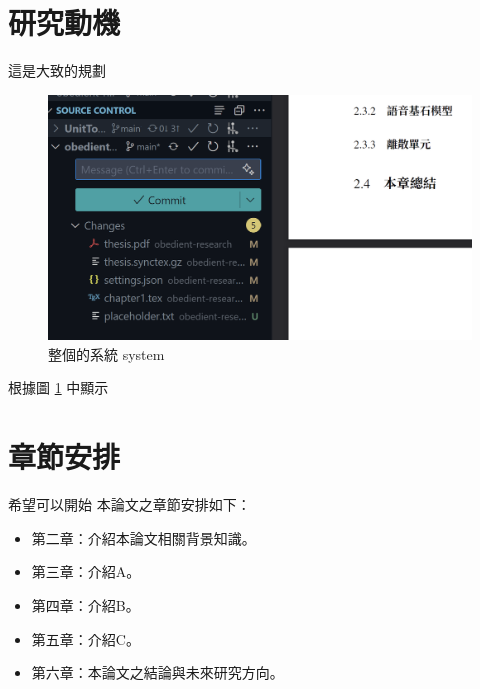 \section{研究動機}

這是大致的規劃
\begin{figure}[hbt!]
    \centering
    \includegraphics{figures/figfake1.png}
    \caption{整個的系統 system}
    \label{fig:mysts}
\end{figure}

根據圖 \ref{fig:mysts} 中顯示



\section{章節安排}
希望可以開始
本論文之章節安排如下：

\begin{itemize}
  \itemsep -2pt %
  \item  第二章：介紹本論文相關背景知識。
  \item  第三章：介紹A。
  \item  第四章：介紹B。
  \item  第五章：介紹C。
  \item  第六章：本論文之結論與未來研究方向。
\end{itemize}



